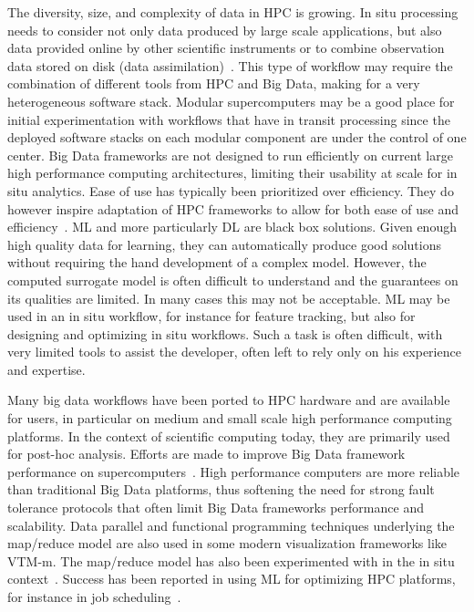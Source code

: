 \begin{refsection}
The diversity, size, and complexity of data in HPC is growing. 
In situ processing needs to consider not only data produced by large scale applications, but also data provided online by other scientific instruments or to combine observation data stored on disk (data assimilation)~\cite{Asch18}. 
This type of workflow may require the combination of different tools from HPC and Big Data, making for a very heterogeneous software stack. 
Modular supercomputers may be a good place for initial experimentation with workflows that have in transit processing since the deployed software stacks on each modular component are under the control of one center.
Big Data frameworks are not designed to run efficiently on current large high performance computing architectures, limiting their usability at scale for in situ analytics. 
Ease of use has typically been prioritized over efficiency. They do however inspire adaptation of HPC frameworks to allow for both ease of use and efficiency~\cite{Plimpton11}.
ML and more particularly DL are black box solutions. 
Given enough high quality data for learning, they can automatically produce good solutions without requiring the hand development of a complex model.
However, the  computed surrogate model is often difficult to understand and the guarantees on its qualities are limited. 
In many cases this may not be acceptable. 
ML may be used in an in situ workflow, for instance for feature tracking, but also for designing and optimizing in situ workflows. 
Such a task is often  difficult, with very limited tools to assist the developer, often left to rely only on his experience and expertise. 

Many big data workflows have been ported to HPC hardware and are available for users, in particular on medium and small scale high performance computing platforms. 
In the context of scientific computing today, they are primarily used for post-hoc analysis. 
Efforts are made to improve Big Data framework performance on supercomputers~\cite{Plimpton11}. 
High performance computers are more reliable than traditional Big Data platforms, thus softening the need for strong fault tolerance protocols that often limit Big Data frameworks performance and scalability. 
Data parallel and functional programming techniques underlying the map/reduce model are also used in some modern visualization frameworks like VTM-m. 
The map/reduce model has also been experimented with in the in situ context~\cite{Wang15}.
Success has been reported in using ML for optimizing HPC platforms, for instance in job scheduling~\cite{Carastan-Santos17}.



\end{refsection}
